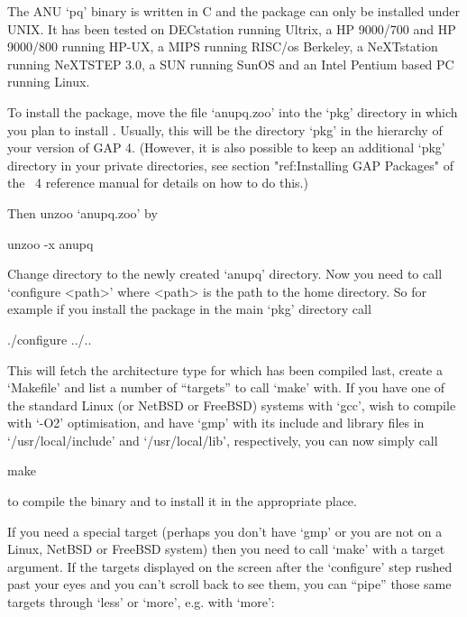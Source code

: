 

The ANU `pq' binary is written in C and the package can only be installed
under UNIX. It has  been  tested  on  DECstation  running  Ultrix,  a  HP
9000/700 and HP 9000/800 running HP-UX, a MIPS running RISC/os  Berkeley,
a NeXTstation running NeXTSTEP 3.0, a SUN  running  SunOS  and  an  Intel
Pentium based PC running Linux.

To install the {\ANUPQ} package, move the file `anupq.zoo' into the `pkg'
directory in which you plan to install {\ANUPQ}. Usually,  this  will  be
the directory `pkg' in the hierarchy of your version of GAP 4.  (However,
it is also possible to keep an additional `pkg' directory in your private
directories, see section "ref:Installing GAP Packages"  of  the  {\GAP}~4
reference manual for details on how to do this.)

Then unzoo `anupq.zoo' by

\begintt
unzoo -x anupq
\endtt

Change directory to the newly created `anupq' directory. Now you need  to
call `configure <path>' where <path> is  the  path  to  the  {\GAP}  home
directory. So for example if you install the package in  the  main  `pkg'
directory call

\begintt
./configure ../..
\endtt

This will fetch the architecture type for which {\GAP} has been  compiled
last, create a `Makefile' and list a number of ``targets'' to call `make'
with. If you have one of  the  standard  Linux  (or  NetBSD  or  FreeBSD)
systems with `gcc', wish to compile with  `-O2'  optimisation,  and  have
`gmp' with its include and  library  files  in  `/usr/local/include'  and
`/usr/local/lib', respectively, you can now simply call

\begintt
make
\endtt

to compile the binary and to install it in the appropriate place.

If you need a special target (perhaps you don't have `gmp' or you are not
on a Linux, NetBSD or FreeBSD system) then you need to call `make' with a
target argument. If  the  targets  displayed  on  the  screen  after  the
`configure' step rushed past your eyes and you can't scroll back  to  see
them, you can ``pipe'' those same targets through `less' or `more',  e.g.
with `more':

